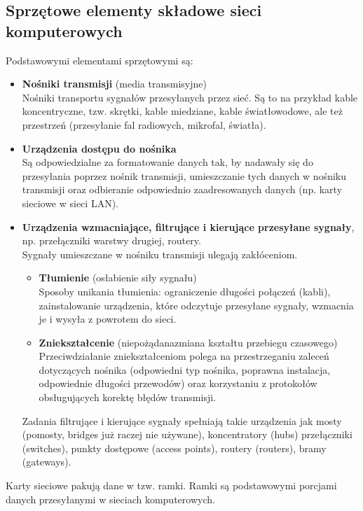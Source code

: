 \documentclass[a4paper]{article}
\begin{document}
\subsection{Sprzętowe	elementy	składowe	sieci	komputerowych}
Podstawowymi	elementami	sprzętowymi	są:
\begin{itemize}
    \item \textbf{Nośniki	transmisji}	(media	transmisyjne)\\
    Nośniki	 transportu	 sygnałów	 przesyłanych	 przez	 sieć. Są to na przykład kable koncentryczne, tzw.
    skrętki, kable miedziane,  kable	 światłowodowe,	 ale	 też	 przestrzeń (przesyłanie	fal	radiowych,	mikrofal,	światła).
    \item \textbf{Urządzenia	dostępu do	nośnika}\\
    Są odpowiedzialne za	formatowanie danych	tak, by nadawały się do	 przesyłania poprzez nośnik	 transmisji, umieszczanie	 tych	 danych	 w nośniku	transmisji	oraz	odbieranie	odpowiednio zaadresowanych	danych	(np. karty sieciowe w sieci LAN).
    \item \textbf{Urządzenia	wzmacniające,	filtrujące	i	kierujące	przesyłane	sygnały},	np.	przełączniki warstwy	drugiej, routery.\\
    Sygnały	 umieszczane w	 nośniku transmisji ulegają zakłóceniom.
    \begin{itemize}
        \item \textbf{Tłumienie} (osłabienie siły sygnału)\\
        Sposoby unikania tłumienia:  ograniczenie	 długości	 połączeń	 (kabli), zainstalowanie	urządzenia,	które odczytuje	przesyłane	sygnały,	wzmacnia	je	i
        wysyła	z	powrotem	do	sieci.
        \item \textbf{Zniekształcenie} (niepożądanazmiana kształtu przebiegu czasowego)\\
        Przeciwdziałanie	 zniekształceniom polega	 na	 przestrzeganiu	 zaleceń dotyczących	 nośnika	 (odpowiedni typ nośnika, poprawna instalacja, odpowiednie	 długości	 przewodów) oraz korzystaniu z protokołów obsługujących korektę	błędów	transmisji.
    \end{itemize}
    Zadania	filtrujące	i	kierujące	sygnały	spełniają	takie	urządzenia	jak	mosty (pomosty,	bridges już	 raczej	 nie	 używane),	 koncentratory (hubs)	 przełączniki (switches), punkty	 dostępowe (access points), routery (routers),	bramy (gateways).
\end{itemize}

Karty	sieciowe	pakują	dane	w	tzw.	ramki. Ramki	są	podstawowymi	porcjami	danych	przesyłanymi	w	sieciach	komputerowych.
\end{document}
